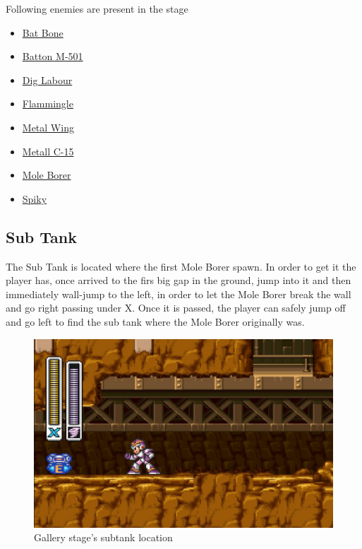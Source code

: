 Following enemies are present in the stage\cite{wiki:Gallery}
\begin{itemize}
	\item \hyperlink{enem:Bat_Bone}{Bat Bone} 
	\item \hyperlink{enem:Batton_M-501}{Batton M-501} 
	\item \hyperlink{enem:Dig_Labour}{Dig Labour} 
	\item \hyperlink{enem:Flammingle}{Flammingle} 
	\item \hyperlink{enem:Metal_Wing}{Metal Wing} 
	\item \hyperlink{enem:Metall_C-15}{Metall C-15} 
	\item \hyperlink{miniboss:Mole_Borer}{Mole Borer}
	\item \hyperlink{enem:Spiky}{Spiky}
\end{itemize}

\subsection{Sub Tank}
The Sub Tank is located where the first Mole Borer spawn. In order to get it the player has, once arrived to the firs big gap in the ground, jump into it and then immediately wall-jump to the left, in order to let the Mole Borer break the wall and go right passing under X. Once it is passed, the player can safely jump off and go left to find the sub tank where the Mole Borer originally was. 
\begin{figure}[htp]
	\centering
	\includegraphics[width=0.5\linewidth]{figures/X1/Armored_armadillo/Armadillo_tank.jpg}
	\caption{Gallery stage's subtank location}
\end{figure}

